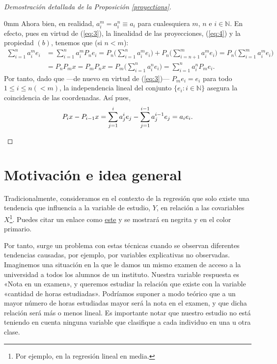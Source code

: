 \begin{proof}[Demostración detallada de la Proposición \ref{proyections}]
\begin{addmargin}[5mm]{0mm}
			Ahora bien, en realidad, $a_i^m=a_i^n\equiv a_i$ para cualesquiera $m$, $n$ e $i\in\mathbb{N}$. En efecto, pues en virtud de (\ref{eq:3}), la linealidad de las proyecciones, (\ref{eq:4}) y la propiedad $(b)$, tenemos que (si $n<m$):
			\begin{align*}
				\sum_{i=1}^na_i^m e_i&=\sum_{i=1}^na_i^mP_ne_i=P_n\Big(\sum_{i=1}^n a_i^me_i\Big)+P_n\Big(\sum_{i=n+1}^m a_i^me_i\Big)=P_n\Big(\sum_{i=1}^m a_i^me_i\Big)\\
				&=P_nP_mx=P_mP_nx=P_m\Big(\sum_{i=1}^n a_i^ne_i\Big)=\sum_{i = 1}^n{a_i^nP_me_i}.
			\end{align*}
			Por tanto, dado que ---de nuevo en virtud de (\ref{eq:3})--- $P_me_i=e_i$ para todo $1\leq i\leq n(<m)$, la independencia lineal del conjunto $\{e_i\colon i\in\mathbb{N}\}$ asegura la coincidencia de las coordenadas. Así pues,
			\[P_ix-P_{i-1}x=\sum_{j=1}^i a^i_je_j-\sum_{j=1}^{i-1}a^{i-1}_je_j=a_ie_i.\qedhere\]
		\end{addmargin}
	\end{proof}
	
	\renewcommand*{\proofname}{Demostración}
	
	
	
	\chapter{Motivación e idea general}
	
	Tradicionalmente, consideramos en el contexto de la regresión que solo
	existe una tendencia que influencia a la variable de estudio, $Y$, en
	relación a las covariables $X$\footnote{Por ejemplo, en la regresión
		lineal en media.}. Puedes citar un enlace como
	\href{https://www.anthropic.com}{este} y se mostrará en negrita y en
	el color primario.
	
	Por tanto, surge un problema con estas técnicas cuando se observan diferentes tendencias causadas, por ejemplo, por variables explicativas no observadas. Imaginemos una situación en la que le damos un mismo examen de acceso a la universidad a todos los alumnos de un instituto. Nuestra variable respuesta es «Nota en un examen», y queremos estudiar la relación que existe con la variable «cantidad de horas estudiadas». Podríamos suponer a modo teórico que a un mayor número de horas estudiadas mayor será la nota en el examen, y que dicha relación será más o menos lineal. Es importante notar que nuestro estudio no está teniendo en cuenta ninguna variable que clasifique a cada individuo en una u otra clase.
	
